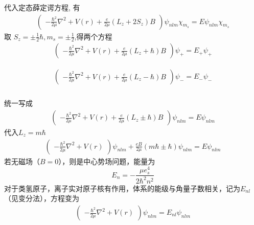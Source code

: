\begin{frame}
  \frametitle{}
代入定态薛定谔方程, 有
\[ 
\begin{aligned}
  \begin{pmatrix}
    - \frac{\hbar^2}{2\mu} \nabla^2 +V(r) + \frac{e}{2 \mu } (L_z + 2S_z)B 
   \end{pmatrix}  \psi _{nlm}  \chi _{m_s} = E \psi _{nlm}  \chi _{m_s}  
\end{aligned}
\]
取 $S_z = \pm \frac{1}{2} \hbar, m_s = \pm \frac{1}{2} $,得两个方程
\[ 
\begin{aligned}
  \begin{pmatrix}
    - \frac{\hbar^2}{2\mu} \nabla^2 +V(r) + \frac{e}{2 \mu } (L_z + \hbar)B 
   \end{pmatrix} \psi _{+} = E_{+} \psi _{+} 
\end{aligned}
\]

\[ 
\begin{aligned}
  \begin{pmatrix}
    - \frac{\hbar^2}{2\mu} \nabla^2 +V(r) + \frac{e}{2 \mu } (L_z - \hbar)B 
   \end{pmatrix} \psi _{-} = E_{-} \psi _{-} 
\end{aligned}
\]
\end{frame} 

\begin{frame}[label=current]
  \frametitle{}
统一写成
\[ 
\begin{aligned}
  \begin{pmatrix}
    - \frac{\hbar^2}{2\mu} \nabla^2 +V(r) + \frac{e}{2 \mu } (L_z \pm \hbar)B 
   \end{pmatrix} \psi _{nlm}  = E \psi _{nlm}
\end{aligned}
\]
代入$L_z = m \hbar$
\begin{equation} \label{eq:enl}
\begin{aligned}
  \begin{pmatrix}
    - \frac{\hbar^2}{2\mu} \nabla^2 +V(r)\end{pmatrix} \psi _{nlm} + \frac{eB}{2 \mu } (m \hbar \pm \hbar) 
    \psi _{nlm}  = E \psi _{nlm}
\end{aligned}
\end{equation}
若无磁场（$B=0$），则是中心势场问题，能量为
\[ E_n = - \frac{\mu e_s^4}{2 \hbar^2 n^2}\]
对于类氢原子，离子实对原子核有\emf[库仑屏蔽]作用，体系的能级与角量子数相关，记为$E_{nl}$ （见变分法），方程变为
\[
\begin{aligned}
  \begin{pmatrix}
    - \frac{\hbar^2}{2\mu} \nabla^2 +V(r) 
   \end{pmatrix} \psi _{nlm}  = E_{nl} \psi _{nlm}
\end{aligned}
\]
\end{frame} 

